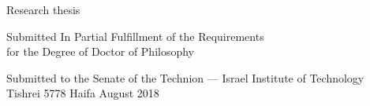 \begin{adjustwidth}{-1cm}{-1cm}
\begin{center}



{\Large Research thesis}


\parbox{30em}{
\begin{center}
Submitted In Partial Fulfillment of the Requirements
\\
for the Degree of Doctor of Philosophy
\end{center}
}


{\large \author{}}


\parbox{32em}{
\begin{center}
Submitted to the Senate of the Technion --- Israel Institute of Technology
\\
Tishrei 5778 \hfill Haifa \hfill August 2018
\end{center}
}

\end{center}
\end{adjustwidth}